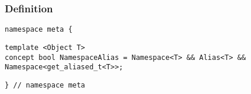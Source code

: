 
\subsubsection{Definition}

\begin{verbatim}
namespace meta {
\end{verbatim}
\begin{verbatim}
template <Object T>
concept bool NamespaceAlias = Namespace<T> && Alias<T> && Namespace<get_aliased_t<T>>;

\end{verbatim}
\begin{verbatim}
} // namespace meta
\end{verbatim}
